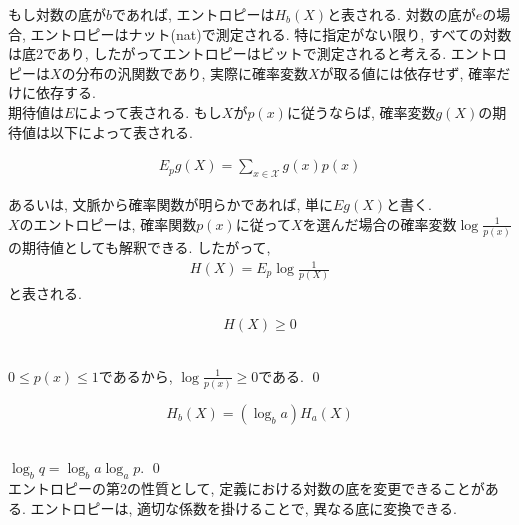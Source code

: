 \documentclass[a4j]{jsarticle}
\begin{document}
もし対数の底が$b$であれば, エントロピーは$H_b(X)$と表される. 対数の底が$e$の場合, エントロピーはナット(nat)で測定される. 特に指定がない限り, すべての対数は底2であり, したがってエントロピーはビットで測定されると考える. エントロピーは$X$の分布の汎関数であり, 実際に確率変数$X$が取る値には依存せず, 確率だけに依存する.\\

期待値は$E$によって表される. もし$X$が$p(x)$に従うならば, 確率変数$g(X)$の期待値は以下によって表される.

\begin{align}
	E_{p}g(X) = \sum_{x \in \mathcal{X}} g(x) p(x)
\end{align}

あるいは, 文脈から確率関数が明らかであれば, 単に$Eg(X)$と書く.\\

 $X$のエントロピーは, 確率関数$p(x)$に従って$X$を選んだ場合の確率変数$\log \frac{1}{p(x)}$の期待値としても解釈できる. したがって,
\begin{align}
	H(X) = E_{p} \log \frac{1}{p(X)}
\end{align}
と表される.\\

\begin{itembox}[l]{}
	\begin{equation}
		H(X) \geq 0
	\end{equation}
\end{itembox}\\

 $0 \leq p(x) \leq 1$であるから, $\log \frac{1}{p(x)} \geq 0$である. \qed\\

\begin{itembox}[l]{}
	\begin{equation}
		H_b(X) = (\log_b a)H_a(X)
	\end{equation}
\end{itembox}\\

 $\log_b q = \log_b a \log_a p$. \qed\\

エントロピーの第2の性質として, 定義における対数の底を変更できることがある. エントロピーは, 適切な係数を掛けることで, 異なる底に変換できる.\\

\end{document}
